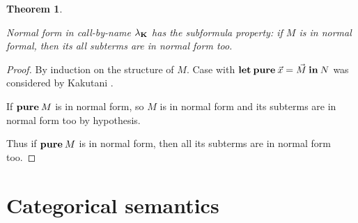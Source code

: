 \documentclass[a4paper]{article}
\newtheorem{theorem}{Theorem}
\begin{document}
\begin{theorem}
  $ $

  Normal form in call-by-name $\lambda_{{\bf K}}$ has the subformula property: if $M$ is in normal formal, then its all subterms are in normal form too.

\end{theorem}

\begin{proof}
  By induction on the structure of $M$.
  Case with ${\bf let \: pure\:} \vec{x} = \vec{M} {\: \bf in \:} N$ was considered by Kakutani \cite{ModalK} \cite{ModalK1}.

  If ${\bf pure \:} M$ is in normal form, so $M$ is in normal form and its subterms are in normal form too by hypothesis.

  Thus if ${\bf pure \:} M$ is in normal form, then all its subterms are in normal form too.
\end{proof}

\section{Categorical semantics}
\end{document}

